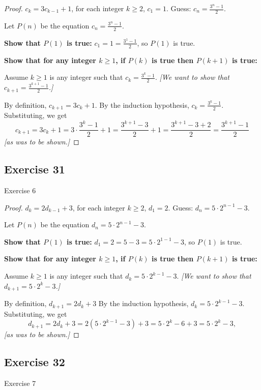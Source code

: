 \documentclass[14pt]{extarticle}
\newcommand{\dps}{\displaystyle}
\begin{document}
\begin{proof}
\(c_k = 3c_{k-1} + 1\), for each integer \(k \geq 2\), \(c_1 = 1\). Guess: \(\dps c_n = \frac{3^n - 1}{2}\).

Let $P(n)$ be the equation \(\dps c_n = \frac{3^n - 1}{2}\).

{\bf Show that \(P(1)\) is true:} \(\dps c_1 = 1 = \frac{3^1 - 1}{2}\), so $P(1)$ is true.

{\bf Show that for any integer \(k \geq 1\), if \(P(k)\) is true then \(P(k+1)\) is true:}

Assume \(k \geq 1\) is any integer such that \(\dps c_k = \frac{3^k - 1}{2}\). 
{\it [We want to show that \(\dps c_{k+1} = \frac{3^{k+1} - 1}{2}\).]}

By definition, \(c_{k+1} = 3c_k + 1\).
By the induction hypothesis, \(\dps c_k = \frac{3^k - 1}{2}\).
Substituting, we get
\[
c_{k+1} = 3c_k + 1 = 3 \cdot \frac{3^k - 1}{2} + 1 = \frac{3^{k+1} - 3}{2} + 1 
= \frac{3^{k+1} - 3 + 2}{2} = \frac{3^{k+1} - 1}{2}
\]
{\it [as was to be shown.]}
\end{proof}

\subsection{Exercise 31}
Exercise 6

\begin{proof}
\(d_k = 2d_{k-1} + 3\), for each integer \(k \geq 2\), \(d_1 = 2\). Guess: \(\dps d_n = 5 \cdot 2^{n-1} - 3\).

Let $P(n)$ be the equation \(\dps d_n = 5 \cdot 2^{n-1} - 3\).

{\bf Show that \(P(1)\) is true:} \(\dps d_1 = 2 = 5 - 3 = 5 \cdot 2^{1-1} - 3\), so $P(1)$ is true.

{\bf Show that for any integer \(k \geq 1\), if \(P(k)\) is true then \(P(k+1)\) is true:}

Assume \(k \geq 1\) is any integer such that \(\dps d_k = 5 \cdot 2^{k-1} - 3\). 
{\it [We want to show that \(\dps d_{k+1} = 5 \cdot 2^k - 3\).]}

By definition, \(d_{k+1} = 2d_k + 3\)
By the induction hypothesis, \(d_k = 5 \cdot 2^{k-1} - 3\).
Substituting, we get
\[
d_{k+1} = 2d_k + 3 = 2(5 \cdot 2^{k-1} - 3) + 3 = 5 \cdot 2^k - 6 + 3 = 5 \cdot 2^k - 3,
\]
{\it [as was to be shown.]}
\end{proof}

\subsection{Exercise 32}
Exercise 7
\end{document}
